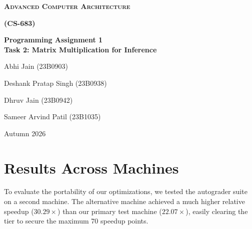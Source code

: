 \documentclass[11pt]{article}
\newcommand{\StudentOne}{Abhi Jain (23B0903)}
\newcommand{\StudentTwo}{Deshank Pratap Singh (23B0938)}
\newcommand{\StudentThree}{Dhruv Jain (23B0942)}
\newcommand{\StudentFour}{Sameer Arvind Patil (23B1035)}
\begin{document}

\begin{titlepage}
    \centering
    {\scshape\bfseries\Huge Advanced Computer Architecture\par}
    \vspace{0.2cm}
    {\scshape\bfseries\Huge (CS-683)\par}
    \vspace{0.8cm}
    {\huge \textbf{Programming Assignment 1 \\ Task 2: Matrix Multiplication for Inference}\par
    }
    \vspace{1cm}

    {\Large \StudentOne\par}
    {\Large \StudentTwo\par}
    {\Large \StudentThree\par}
    {\Large \StudentFour\par}
    \vspace{0.5cm}
    
    \vfill
    {\large Autumn 2026\par}
  \end{titlepage}
  
\tableofcontents

\newpage

\newpage


\newpage


\newpage
\appendix
\section{Results Across Machines}

To evaluate the portability of our optimizations, we tested the autograder suite on a second machine. The alternative machine achieved a much higher relative speedup ($30.29\times$) than our primary test machine ($22.07\times$), easily clearing the tier to secure the maximum 70 speedup points.
\end{document}
